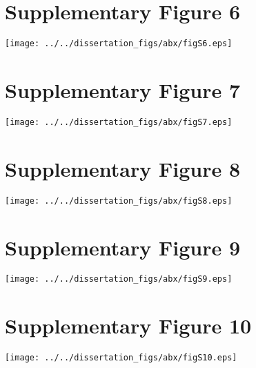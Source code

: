 \newpage
\section*{Supplementary Figure 6}

\begin{figure*}[h!]
	\centerline{
		\texttt{[image: ../../dissertation\_figs/abx/figS6.eps]}} 
	
\end{figure*}

\newpage
\section*{Supplementary Figure 7}

\begin{figure*}[h!]
	\centerline{
		\texttt{[image: ../../dissertation\_figs/abx/figS7.eps]}} 
	
\end{figure*}

\newpage
\section*{Supplementary Figure 8}

\begin{figure*}[h!]
	\centerline{
		\texttt{[image: ../../dissertation\_figs/abx/figS8.eps]}} 
	
\end{figure*}

\newpage
\section*{Supplementary Figure 9}

\begin{figure*}[h!]
	\centerline{
		\texttt{[image: ../../dissertation\_figs/abx/figS9.eps]}} 
	
\end{figure*}

\newpage
\section*{Supplementary Figure 10}

\begin{figure*}[h!]
	\centerline{
		\texttt{[image: ../../dissertation\_figs/abx/figS10.eps]}} 
	
\end{figure*}

